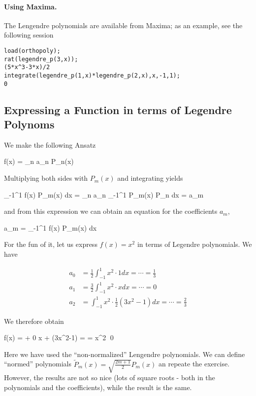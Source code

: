 \paragraph{Using Maxima.} The Lengendre polynomials are available from Maxima; as an example, see the following session

\begin{verbatim}
load(orthopoly);
rat(legendre_p(3,x));
(5*x^3-3*x)/2
integrate(legendre_p(1,x)*legendre_p(2,x),x,-1,1);
0
\end{verbatim}

\subsection{Expressing a Function in terms of Legendre Polynoms}

We make the following Ansatz

\bee
f(x) = \sum_n a_n P_n(x)
\eee

Multiplying both sides with $P_m(x)$ and integrating yields

\bee
\int_{-1}^1 f(x) P_m(x) dx = \sum_n a_n \int_{-1}^1 P_m(x) P_n dx =  a_m
\eee

and from this expression we can obtain an equation for the coefficients $a_m$,

\bee
a_m =  \int_{-1}^1 f(x) P_m(x) dx
\eee

For the fun of it, let us express $f(x)=x^2$ in terms of Legendre polynomials. We have

\begin{align*}
  a_0 &= \frac{1}{2} \int_{-1}^1 x^2 \cdot 1 dx = \cdots = \frac{1}{3}\\
  a_1 &= \frac{3}{2} \int_{-1}^1 x^2 \cdot x dx = \cdots = 0\\
  a_2 &= \int_{-1}^1 x^2 \cdot \frac{1}{2}(3x^2-1) dx = \cdots = \frac{2}{3}
\end{align*}

We therefore obtain

\bee
f(x) =   + 0 \cdot x +  (3x^2-1) = \cdots = x^2 \qed
\eee

Here we have used the ``non-normalized'' Lengendre polynomials. We can define ``normed'' polynomials $\tilde{P}_m(x) = \sqrt{\frac{2m+1}{2}} P_m(x)$ an repeate the exercise. However, the results are not so nice (lots of square roots - both in the polynomials and the coefficients), while the result is the same.



